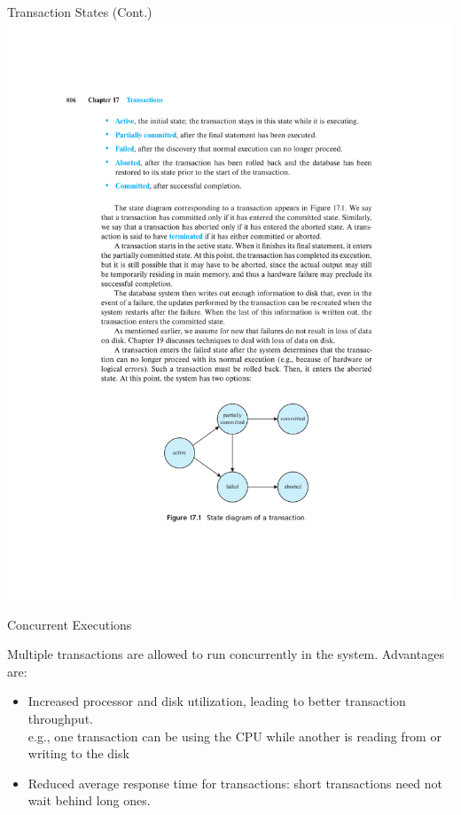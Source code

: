 \documentclass{beamer}
\begin{document}
\begin{frame}{Transaction States (Cont.)}
    \centering
    \includegraphics[width=\textwidth, trim={5.5cm 3cm 5cm 18cm}, clip]{figures/p835_stages.pdf}
\end{frame}

\begin{frame}{Concurrent Executions}

    Multiple transactions are allowed to run concurrently in the system.  Advantages are:
        \begin{itemize}
            \item Increased processor and disk utilization, leading to better transaction throughput. \\        \quad e.g., one transaction can be using the CPU while another is reading from or writing to    the disk
            \item Reduced average response time for transactions: short transactions need not wait behind long ones.
        \end{itemize}

\end{frame}
\end{document}
